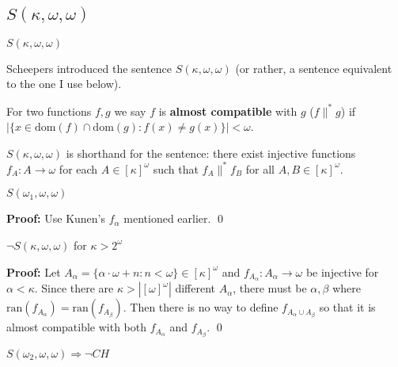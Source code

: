 \documentclass{beamer}
\theoremstyle{theorem}
\theoremstyle{definition}
\newcommand{\<}{\langle}
\renewcommand{\>}{\rangle}
\newcommand{\al}[1]{{#1}^*}
\newcommand{\alcomp}{\al\parallel}
\newcommand{\dom}{\textrm{dom}}
\begin{document}
\subsection{$S(\kappa,\omega,\omega)$}

\begin{frame}{$S(\kappa,\omega,\omega)$}

Scheepers introduced the sentence $S(\kappa,\omega,\omega)$ (or rather, a sentence equivalent to the one I use below).\pause

  \begin{definition}
    For two functions $f,g$ we say $f$ is \textbf{almost compatible} with $g$ ($f\alcomp g$) if $|\{x\in\dom(f)\cap\dom(g):f(x)\not=g(x)\}|<\omega$.
  \end{definition}\pause

\begin{definition}
  $S(\kappa,\omega,\omega)$ is shorthand for the sentence: there exist injective functions $f_A:A\to\omega$ for each $A\in[\kappa]^\omega$ such that $f_A\alcomp f_B$ for all $A,B\in[\kappa]^\omega$.
\end{definition}

\end{frame}

\begin{frame}
  \begin{theorem}
    $S(\omega_1,\omega,\omega)$
  \end{theorem}

  \textbf{Proof:}
    Use Kunen's $f_\alpha$ mentioned earlier. \qed

  \pause\vspace{12pt}

  \begin{theorem}
    $\neg S(\kappa,\omega,\omega)$ for $\kappa>2^\omega$
  \end{theorem}

  \textbf{Proof:}
    Let $A_\alpha=\{\alpha\cdot\omega+n:n<\omega\}\in[\kappa]^\omega$ and $f_{A_\alpha}:A_\alpha\to\omega$ be injective for $\alpha<\kappa$. Since there are $\kappa>|[\omega]^\omega|$ different $A_\alpha$, there must be $\alpha,\beta$ where $\text{ran}(f_{A_\alpha})=\text{ran}(f_{A_\beta})$. Then there is no way to define $f_{A_\alpha\cup A_\beta}$ so that it is almost compatible with both $f_{A_\alpha}$ and $f_{A_\beta}$. \qed\pause

  \begin{corollary}
    $S(\omega_2,\omega,\omega) \Rightarrow \neg CH$
  \end{corollary}
\end{frame}
\end{document}
